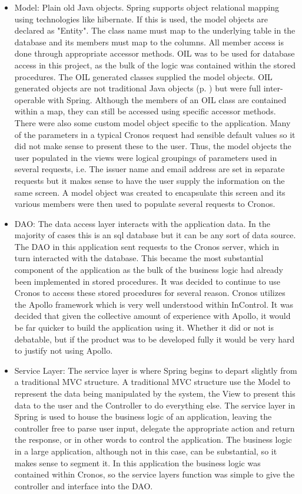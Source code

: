 \documentclass[a4paper, 11pt, titlepage]{article}
\begin{document}
\begin{itemize} 
\item Model: Plain old Java objects. Spring supports object relational mapping using technologies like hibernate. If this is used, the model objects are declared as "Entity". The class name must map to the underlying table in the database and its members must map to the columns. All member access is done through appropriate accessor methods. 
OIL was to be used for database access in this project, as the bulk of the logic was contained within the stored procedures. The OIL generated classes supplied the model objects. OIL generated objects are not traditional Java objects (p. \pageref{metadata}) but were full inter-operable with Spring. Although the members of an OIL class are contained within a map, they can still be accessed using specific accessor methods. 
There were also some custom model object specific to the application. Many of the parameters in a typical Cronos request had sensible default values so it did not make sense to present these to the user. Thus, the model objects the user populated in the views were logical groupings of parameters used in several requests, i.e. The issuer name and email address are set in separate requests but it makes sense to have the user supply the information on the same screen. A model object was created to encapsulate this screen and its various members were then used to populate several requests to Cronos. 
\item DAO: The data access layer interacts with the application data. In the majority of cases this is an sql database but it can be any sort of data source. The DAO in this application sent requests to the Cronos server, which in turn interacted with the database. This became the most substantial component of the application as the bulk of the business logic had already been implemented in stored procedures. It was decided to continue to use Cronos to access these stored procedures for several reason. Cronos utilizes the Apollo framework which is very well understood within InControl. It was decided that given the collective amount of experience with Apollo, it would be far quicker to build the application using it. Whether it did or not is debatable, but if the product was to be developed fully it would be very hard to justify not using Apollo. 
\item Service Layer: The service layer is where Spring begins to depart slightly from a traditional MVC structure. A traditional MVC structure use the Model to represent the data being manipulated by the system, the View to present this data to the user and the Controller to do everything else. The service layer in Spring is used to house the business logic of an application, leaving the controller free to parse user input, delegate the appropriate action and return the response, or in other words to control the application. The business logic in a large application, although not in this case, can be substantial, so it makes sense to segment it. In this application the business logic was contained within Cronos, so the service layers function was simple to give the controller and interface into the DAO. 

\end{itemize}
\end{document}
